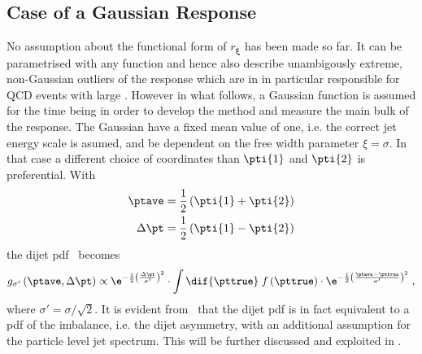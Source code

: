 \subsection{Case of a Gaussian Response}

No assumption about the functional form of $r_{\mathbf{\xi}}$ has been
made so far.
It can be parametrised with any function and hence also
describe unambigously extreme, non-Gaussian outliers of the response which are in
in particular responsible for QCD events with large \mht.
However in what follows, a Gaussian function is assumed for the time
being in order to develop the method and measure the main bulk of the
response.
The Gaussian have a fixed mean value of one, i.e. the
correct jet energy scale is asumed, and be dependent on the free width
parameter \mbox{$\mathcal{\xi} = \sigma$}.
In that case a different choice of coordinates than $\pti{1}$ and
$\pti{2}$ is preferential.
With
\begin{align}
  \label{eq:ResFit:TransformedCoordinates}
  \begin{split}
    \ptave     &  = \frac{1}{2}\left(\pti{1}+\pti{2}\right) \\
    \Delta\pt  &  = \frac{1}{2}\left(\pti{1}-\pti{2}\right)
  \end{split}
\end{align} 
the dijet pdf~ becomes
\begin{equation}
  \label{eq:ResFit:DijetPdfTransformed}
   g_{\sigma'}\left(\ptave,\Delta\pt\right) \propto
   \e^{-\frac{1}{2}\left(\frac{\Delta\pt}{\sigma'}\right)^{2}}\cdot
   \int\dif{\pttrue}\;f\left(\pttrue\right)\cdot
   \e^{-\frac{1}{2}\left(\frac{\ptave - \pttrue}{\sigma'}\right)^{2}}
   \; ,
\end{equation}
where \mbox{$\sigma' = \sigma/\sqrt{2}$}.
It is evident from~ that the dijet
pdf is in fact equivalent to a pdf of the \pt imbalance, i.e. the dijet
asymmetry, with an additional assumption for the particle level jet
\pt spectrum.
This will be further discussed and exploited in .
